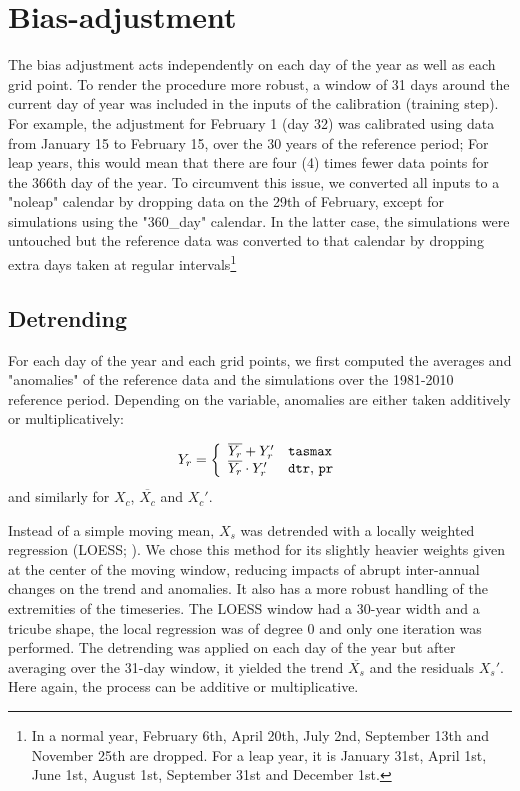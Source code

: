 \documentclass[letterpaper,10pt]{article}
\begin{document}
\section{Bias-adjustment}
The bias adjustment acts independently on each day of the year as well as each grid point.
To render the procedure more robust, a window of 31 days around the current day of year was included in the inputs of the calibration (training step).
For example, the adjustment for February 1 (day 32) was calibrated using data from January 15 to February 15, over the 30 years of the reference period;
For leap years, this would mean that there are four (4) times fewer data points for the 366th day of the year.
To circumvent this issue, we converted all inputs to a "noleap" calendar by dropping data on the 29th of February, except for simulations using the "360_day" calendar.
In the latter case, the simulations were untouched but the reference data was converted to that calendar by dropping extra days taken at regular intervals\footnote{In a normal year, February 6th, April 20th, July 2nd, September 13th and November 25th are dropped. For a leap year, it is January 31st, April 1st, June 1st, August 1st, September 31st and December 1st.}

\subsection{Detrending}
For each day of the year and each grid points, we first computed the averages and "anomalies" of the reference data and the simulations over the 1981-2010 reference period.
Depending on the variable, anomalies are either taken additively or multiplicatively:

\begin{align}
Y_r = \left\{ \begin{array}{ll} \overline{Y_r} + Y_r' & \text{\texttt{tasmax}} \\ \overline{Y_r}\cdot Y_r' & \text{\texttt{dtr}, \texttt{pr}} \end{array}\right.
\end{align}
and similarly for $X_c$, $\overline{X_c}$ and $X_c'$.

Instead of a simple moving mean, $X_s$ was detrended with a locally weighted regression (LOESS; \cite{Cleveland79}).
We chose this method for its slightly heavier weights given at the center of the moving window, reducing impacts of abrupt inter-annual changes on the trend and anomalies.
It also has a more robust handling of the extremities of the timeseries.
The LOESS window had a 30-year width and a tricube shape, the local regression was of degree 0 and only one iteration was performed.
The detrending was applied on each day of the year but after averaging over the 31-day window, it yielded the trend $\overline{X_s}$ and the residuals $X_s'$.
Here again, the process can be additive or multiplicative.
\end{document}
